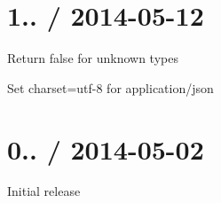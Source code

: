 \section*{1.. / 2014-\/05-\/12 }


\begin{DoxyItemize}
\item Return {\ttfamily false} for unknown types
\item Set charset=utf-\/8 for {\ttfamily application/json}
\end{DoxyItemize}

\section*{0.. / 2014-\/05-\/02 }


\begin{DoxyItemize}
\item Initial release 
\end{DoxyItemize}